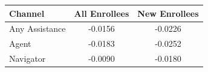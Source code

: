
\begin{tabular}{lcc}
\toprule
Channel & All Enrollees & New Enrollees\\
\midrule
Any Assistance & -0.0156 & -0.0226\\
Agent & -0.0183 & -0.0252\\
Navigator & -0.0090 & -0.0180\\
\bottomrule
\end{tabular}
